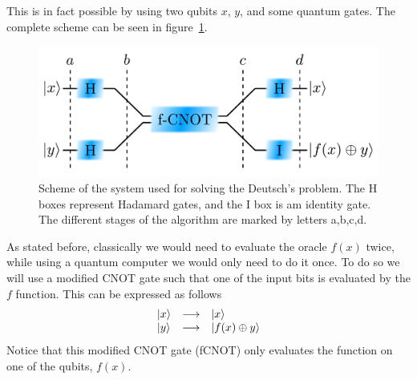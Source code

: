 This is in fact possible by using two qubits $x$, $y$, and some quantum gates. The complete scheme can be seen in figure~\ref{fcnot}.
\begin{figure}[!h]
  \centering
  \includegraphics{chapter02/figures/fcnot.pdf}
  \vspace{-5pt}
  \caption{Scheme of the system used for solving the Deutsch's problem. The H boxes represent Hadamard gates, and the I box is am identity gate. The different stages of the algorithm are marked by letters a,b,c,d.}
  \label{fcnot}
\end{figure}
\FloatBarrier
As stated before, classically we would need to evaluate the oracle $f(x)$ twice, while using a quantum computer we would only need to do it once. To  do so we will use a modified CNOT gate such that one of the input bits is evaluated by the $f$ function. This can be expressed as follows
\begin{equation}
  \begin{array}{lcl}
    |x\rangle & \longrightarrow & |x\rangle \\
    |y\rangle & \longrightarrow & |f(x)\oplus y\rangle
  \end{array}
  \label{fCNOT}
\end{equation}
Notice that this modified CNOT gate (fCNOT) only evaluates the function on one of the qubits, $f(x)$.\\



